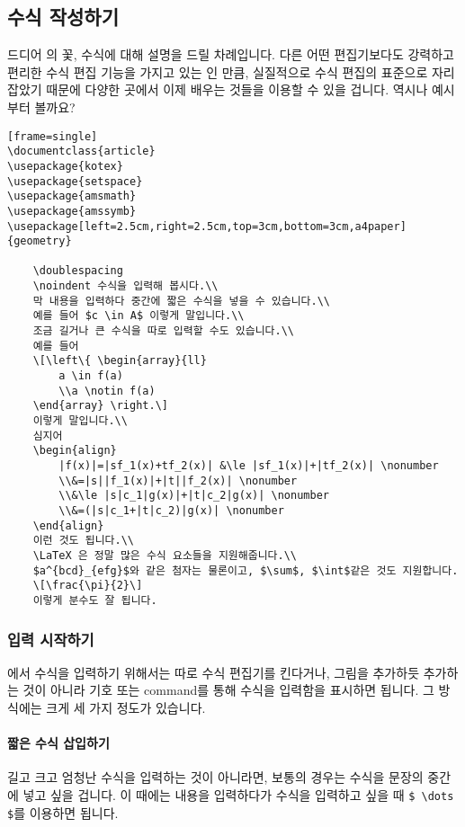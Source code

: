 
\subsection{수식 작성하기}
드디어 \lt 의 꽃, 수식에 대해 설명을 드릴 차례입니다.
다른 어떤 편집기보다도 강력하고 편리한 수식 편집 기능을 가지고 있는 \lt 인 만큼, 실질적으로 수식 편집의 표준으로 자리 잡았기 때문에 다양한 곳에서 이제 배우는 것들을 이용할 수 있을 겁니다.
역시나 예시부터 볼까요?

\begin{verbatim}[frame=single]
\documentclass{article}
\usepackage{kotex}
\usepackage{setspace}
\usepackage{amsmath}
\usepackage{amssymb}
\usepackage[left=2.5cm,right=2.5cm,top=3cm,bottom=3cm,a4paper]{geometry}

	\doublespacing
	\noindent 수식을 입력해 봅시다.\\
	막 내용을 입력하다 중간에 짧은 수식을 넣을 수 있습니다.\\
	예를 들어 $c \in A$ 이렇게 말입니다.\\
	조금 길거나 큰 수식을 따로 입력할 수도 있습니다.\\
	예를 들어
	\[\left\{ \begin{array}{ll}
		a \in f(a)
		\\a \notin f(a)
	\end{array} \right.\]
	이렇게 말입니다.\\
	심지어
	\begin{align}
		|f(x)|=|sf_1(x)+tf_2(x)| &\le |sf_1(x)|+|tf_2(x)| \nonumber
		\\&=|s||f_1(x)|+|t||f_2(x)| \nonumber
		\\&\le |s|c_1|g(x)|+|t|c_2|g(x)| \nonumber
		\\&=(|s|c_1+|t|c_2)|g(x)| \nonumber
	\end{align}
	이런 것도 됩니다.\\
	\LaTeX 은 정말 많은 수식 요소들을 지원해줍니다.\\
	$a^{bcd}_{efg}$와 같은 첨자는 물론이고, $\sum$, $\int$같은 것도 지원합니다.
	\[\frac{\pi}{2}\]
	이렇게 분수도 잘 됩니다.

\end{verbatim}

\subsubsection{입력 시작하기}
\lt 에서 수식을 입력하기 위해서는 따로 수식 편집기를 킨다거나, 그림을 추가하듯 추가하는 것이 아니라 기호 또는 command를 통해 수식을 입력함을 표시하면 됩니다.
그 방식에는 크게 세 가지 정도가 있습니다.

\paragraph{짧은 수식 삽입하기}
길고 크고 엄청난 수식을 입력하는 것이 아니라면, 보통의 경우는 수식을 문장의 중간에 넣고 싶을 겁니다.
이 때에는 내용을 입력하다가 수식을 입력하고 싶을 때 \verb|$ \dots $|를 이용하면 됩니다.

